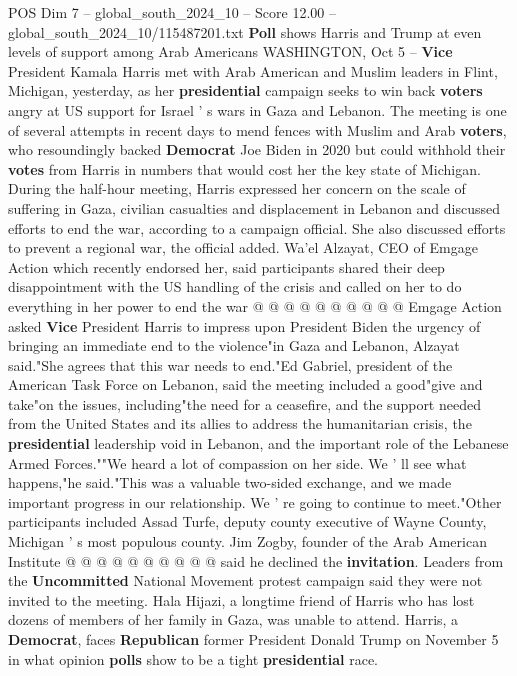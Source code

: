 \begin{textsample}{POS Dim 7 – global\_south\_2024\_10 – Score 12.00 – global\_south\_2024\_10/115487201.txt}  \label{ex:f7_pos_218}
\textbf{Poll} shows Harris and Trump at even levels of support among Arab Americans WASHINGTON, Oct 5 -- \textbf{Vice} President Kamala Harris met with Arab American and Muslim leaders in Flint, Michigan, yesterday, as her \textbf{presidential} campaign seeks to win back \textbf{voters} angry at US support for Israel ' s wars in Gaza and Lebanon.
The meeting is one of several attempts in recent days to mend fences with Muslim and Arab \textbf{voters}, who resoundingly backed \textbf{Democrat} Joe Biden in 2020 but could withhold their \textbf{votes} from Harris in numbers that would cost her the key state of Michigan.
During the half-hour meeting, Harris expressed her concern on the scale of suffering in Gaza, civilian casualties and displacement in Lebanon and discussed efforts to end the war, according to a campaign official.
She also discussed efforts to prevent a regional war, the official added.
Wa'el Alzayat, CEO of Emgage Action which recently endorsed her, said participants shared their deep disappointment with the US handling of the crisis and called on her to do everything in her power to end the war @ @ @ @ @ @ @ @ @ @ Emgage Action asked \textbf{Vice} President Harris to impress upon President Biden the urgency of bringing an immediate end to the violence"in Gaza and Lebanon, Alzayat said."She agrees that this war needs to end."Ed Gabriel, president of the American Task Force on Lebanon, said the meeting included a good"give and take"on the issues, including"the need for a ceasefire, and the support needed from the United States and its allies to address the humanitarian crisis, the \textbf{presidential} leadership void in Lebanon, and the important role of the Lebanese Armed Forces.""We heard a lot of compassion on her side.
We ' ll see what happens,"he said."This was a valuable two-sided exchange, and we made important progress in our relationship.
We ' re going to continue to meet."Other participants included Assad Turfe, deputy county executive of Wayne County, Michigan ' s most populous county.
Jim Zogby, founder of the Arab American Institute @ @ @ @ @ @ @ @ @ @ said he declined the \textbf{invitation}.
Leaders from the \textbf{Uncommitted} National Movement protest campaign said they were not invited to the meeting.
Hala Hijazi, a longtime friend of Harris who has lost dozens of members of her family in Gaza, was unable to attend.
Harris, a \textbf{Democrat}, faces \textbf{Republican} former President Donald Trump on November 5 in what opinion \textbf{polls} show to be a tight \textbf{presidential} race.

\end{textsample}
